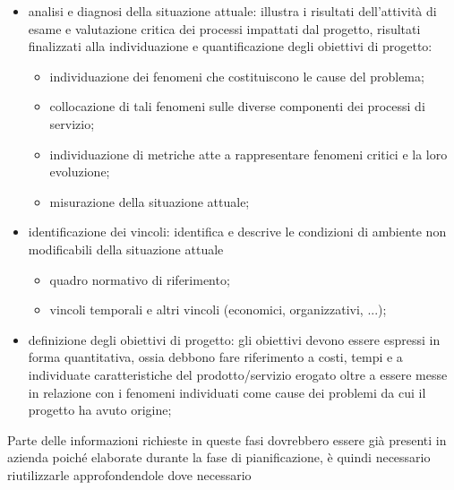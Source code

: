 \begin{itemize}
    \item analisi e diagnosi della situazione attuale: illustra i risultati dell'attività di esame e valutazione critica dei processi impattati dal progetto, risultati finalizzati alla individuazione e quantificazione degli obiettivi di progetto:
        \begin{itemize}
            \item individuazione dei fenomeni che costituiscono le cause del problema;
            \item collocazione di tali fenomeni sulle diverse componenti dei processi di servizio;
            \item individuazione di metriche atte a rappresentare fenomeni critici e la loro evoluzione;
            \item misurazione della situazione attuale;
        \end{itemize}
    \item identificazione dei vincoli: identifica e descrive le condizioni di ambiente non modificabili della situazione attuale
        \begin{itemize}
            \item quadro normativo di riferimento;
            \item vincoli temporali e altri vincoli (economici, organizzativi, ...);
        \end{itemize}
    \item definizione degli obiettivi di progetto: gli obiettivi devono essere espressi in forma quantitativa, ossia debbono fare riferimento a costi, tempi e a individuate caratteristiche del prodotto/servizio erogato oltre a essere messe in relazione con i fenomeni individuati come cause dei problemi da cui il progetto ha avuto origine;
\end{itemize}
\begin{note}
    Parte delle informazioni richieste in queste fasi dovrebbero essere già presenti in azienda poiché elaborate durante la fase di pianificazione, è quindi necessario riutilizzarle approfondendole dove necessario
\end{note}
%
